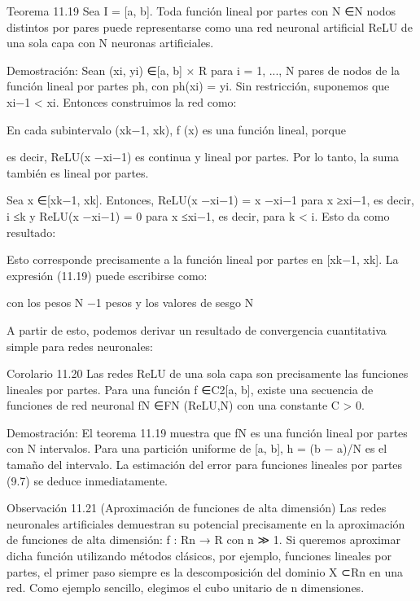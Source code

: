 \begin{frame}
  Teorema 11.19 Sea I = [a, b]. Toda función lineal por partes con N ∈N nodos distintos por pares puede representarse como una red neuronal artificial ReLU de una sola capa con N neuronas artificiales.

  Demostración: Sean (xi, yi) ∈[a, b] × R para i = 1, ..., N pares de nodos de la función lineal por partes ph, con ph(xi) = yi. Sin restricción, suponemos que xi−1 < xi. Entonces construimos la red como:

  En cada subintervalo (xk−1, xk), f (x) es una función lineal, porque

  es decir, ReLU(x −xi−1) es continua y lineal por partes. Por lo tanto, la suma también es lineal por partes.

  Sea x ∈[xk−1, xk]. Entonces, ReLU(x −xi−1) = x −xi−1 para x ≥xi−1, es decir, i ≤k
  y ReLU(x −xi−1) = 0 para x ≤xi−1, es decir, para k < i. Esto da como resultado:

  Esto corresponde precisamente a la función lineal por partes en [xk−1, xk]. La expresión
  (11.19) puede escribirse como:

  con los pesos N −1 pesos
  y los valores de sesgo N

  A partir de esto, podemos derivar un resultado de convergencia cuantitativa simple para redes neuronales:

  Corolario 11.20 Las redes ReLU de una sola capa son precisamente las funciones lineales por partes. Para una función f ∈C2[a, b], existe una secuencia de funciones de red neuronal fN ∈FN (ReLU,N) con una constante C > 0.

  Demostración: El teorema 11.19 muestra que fN es una función lineal por partes con N intervalos.
  Para una partición uniforme de [a, b], h = (b − a)/N es el tamaño del intervalo. La estimación del error para funciones lineales por partes (9.7) se deduce inmediatamente.

  Observación 11.21 (Aproximación de funciones de alta dimensión) Las redes neuronales artificiales demuestran su potencial precisamente en la aproximación de funciones de alta dimensión:
  f : Rn → R con n ≫ 1. Si queremos aproximar dicha función utilizando métodos clásicos, por ejemplo, funciones lineales por partes, el primer paso siempre es la descomposición del dominio X ⊂Rn en una red. Como ejemplo sencillo, elegimos el cubo unitario de n dimensiones.
\end{frame}

